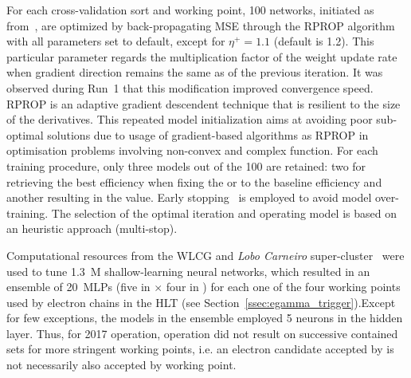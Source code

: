 For each cross-validation sort and working point, 100 networks, initiated
as from~\cite{initnw}, are optimized by back-propagating MSE through the RPROP
algorithm~\cite{rprop} with all parameters set to default, except for
$\eta^+=1.1$ (default is 1.2). This particular
parameter regards the multiplication factor of the weight update rate when
gradient direction remains the same as of the previous iteration. It was
observed during Run~1 that this modification improved convergence speed. RPROP
is an adaptive gradient descendent technique that is resilient to the size of
the derivatives. This repeated model initialization aims at
avoiding poor sub-optimal solutions due to usage of gradient-based algorithms as
RPROP in optimisation problems involving non-convex and complex function.
For each training procedure, only three models out of the 100 are retained: two
for retrieving the best efficiency when fixing the \pd{} or \pf{} to the
baseline \fastcalo{} efficiency and another resulting in the \spmax{} value.
Early stopping~\cite{haykin_2008} is employed to avoid model over-training. The
selection of the optimal iteration and operating model is based on an heuristic
approach (multi-stop).


Computational resources from the WLCG and \emph{Lobo Carneiro}
super-cluster~\cite{lobo_carneiro} were used to tune 1.3~M shallow-learning
neural networks, which resulted in an ensemble of \SI{20}{MLPs} (five in \et{}
$\times$ four in \abseta{})  for each one of the four working points used by
electron chains in the HLT (see Section~\ref{ssec:egamma_trigger}).\@ Except 
for few exceptions, the models in the ensemble employed 5 neurons in the 
hidden layer.  Thus, for 2017 operation, 
\rnn{} operation did not result on
successive contained sets for more stringent working points, i.e. an electron
candidate accepted by \medium{} is not necessarily also accepted by \loose{}
working point. %


